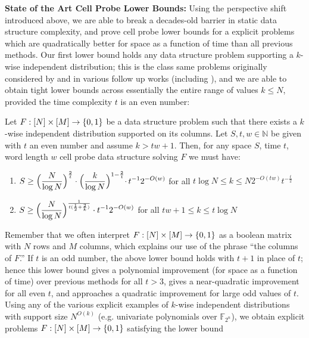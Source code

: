 {\bf \noindent State of the Art Cell Probe Lower Bounds:} Using the perspective shift introduced above, we are able to break a decades-old barrier in static data structure complexity, and prove cell probe lower bounds for a explicit problems which are quadratically better for space as a function of time than all previous methods. Our first lower bound holds any data structure problem supporting a $k$-wise independent distribution; this is the class same problems originally considered by \cite{Siegel89} and in various follow up works (including \cite{panigrahy,kasper}), and we are able to obtain tight lower bounds across essentially the entire range of values $k \leq N$, provided the time complexity $t$ is an even number:
\begin{theorem}

Let $F: [N] \times [M] \to \{0,1\}$ be a data structure problem such that there exists a $k$-wise independent distribution supported on its columns. Let $S,t,w \in \mathbb{N}$ be given with $t$ an even number and assume $k > tw + 1$. Then, for any space $S$, time $t$, word length $w$ cell probe data structure solving $F$ we must have:
\begin{enumerate}
    \item $\begin{aligned}[t]
    S \geq  \Bigl( \frac{N}{\log N}\Bigr)^{\frac{2}{t}} \cdot \Bigl(\frac{k}{\log N}\Bigl)^{1 - \frac{2}{t}}  \cdot\,t^{-1}2^{-O(w)}
  \end{aligned}$ for all $t\log N \leq k \leq N 2^{-O(tw)} t^{-\frac{t}{2}}$
  \item $\begin{aligned}[t]
    S \geq   \Bigl( \frac{N}{\log N}\Bigr)^{\frac{1}{t(\frac{1}{2} + \frac{2}{k})}} \cdot t^{-1}2^{-O(w)}
  \end{aligned}$ for all $tw+1 \leq k \leq t\log N$
\end{enumerate}
\end{theorem}
Remember that we often interpret $F:[N] \times [M] \to \{0,1\}$ as a boolean matrix with $N$ rows and $M$ columns, which explains our use of the phrase ``the columns of $F$.''
If $t$ is an odd number, the above lower bound holds with $t+1$ in place of $t$; hence this lower bound gives a polynomial improvement (for space as a function of time) over previous methods for all $t > 3$, gives a near-quadratic improvement for all even $t$, and approaches a quadratic improvement for large odd values of $t$.  Using any of the various explicit examples of $k$-wise independent distributions with support size $N^{O(k)}$ (e.g. univariate polynomials over $\mathbb{F}_{2^n}$), we obtain explicit problems $F: [N] \times [M] \to \{0,1\}$ satisfying the lower bound
